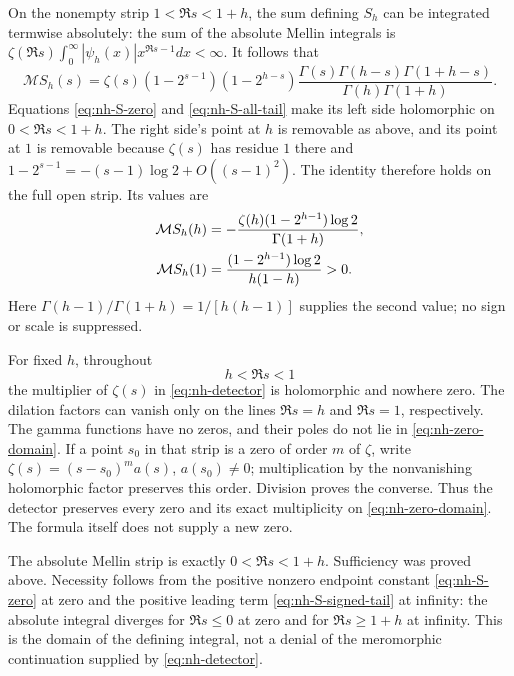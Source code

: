 On the nonempty strip \(1<\Re s<1+h\), the sum defining \(S_h\)
can be integrated termwise absolutely: the sum of the absolute Mellin
integrals is
\(\zeta(\Re s)\int_0^\infty|\psi_h(x)|x^{\Re s-1}dx<\infty\).
It follows that
\begin{equation}\label{eq:nh-detector}
 \mathcal M S_h(s)=\zeta(s)(1-2^{s-1})(1-2^{h-s})
       \frac{\Gamma(s)\Gamma(h-s)\Gamma(1+h-s)}
                    {\Gamma(h)\Gamma(1+h)} .
\end{equation}
Equations \eqref{eq:nh-S-zero} and \eqref{eq:nh-S-all-tail} make its
left side holomorphic on \(0<\Re s<1+h\). The right side's point at
\(h\) is removable as above, and its point at \(1\) is removable because
\(\zeta(s)\) has residue \(1\) there and
\(1-2^{s-1}=-(s-1)\log2+O((s-1)^2)\).
The identity therefore holds on the full open strip. Its values are
\begin{align}
 \mathcal M S_h(h)
 &=-\frac{\zeta(h)(1-2^{h-1})\log2}{\Gamma(1+h)},\notag\\
 \mathcal M S_h(1)
 &=\frac{(1-2^{h-1})\log2}{h(1-h)}>0 .
 \label{eq:nh-detector-removable}
\end{align}
Here \(\Gamma(h-1)/\Gamma(1+h)=1/[h(h-1)]\) supplies the second
value; no sign or scale is suppressed.

For fixed \(h\), throughout
\begin{equation}\label{eq:nh-zero-domain}
 h<\Re s<1
\end{equation}
the multiplier of \(\zeta(s)\) in \eqref{eq:nh-detector} is holomorphic
and nowhere zero. The dilation factors can vanish only on the lines
\(\Re s=h\) and \(\Re s=1\), respectively. The gamma functions
have no zeros, and their poles do not lie in \eqref{eq:nh-zero-domain}.
If a point \(s_0\) in that strip is a zero of order \(m\) of \(\zeta\),
write \(\zeta(s)=(s-s_0)^m a(s)\), \(a(s_0)\ne0\); multiplication
by the nonvanishing holomorphic factor preserves this order. Division
proves the converse. Thus the detector preserves every zero and its
exact multiplicity on \eqref{eq:nh-zero-domain}. The formula itself
does not supply a new zero.

The absolute Mellin strip is exactly \(0<\Re s<1+h\).
Sufficiency was proved above. Necessity follows from the positive
nonzero endpoint constant \eqref{eq:nh-S-zero} at zero and the positive
leading term \eqref{eq:nh-S-signed-tail} at infinity: the absolute
integral diverges for \(\Re s\le0\) at zero and for
\(\Re s\ge1+h\) at infinity. This is the domain of the defining
integral, not a denial of the meromorphic continuation supplied by
\eqref{eq:nh-detector}.


